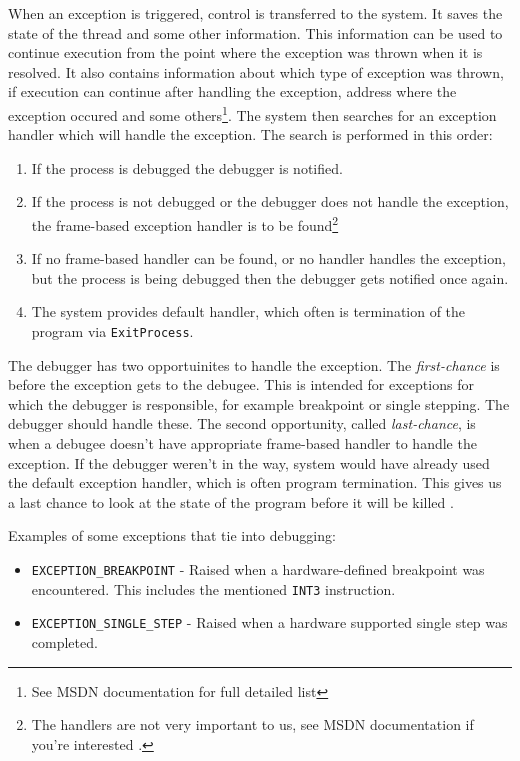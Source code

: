 When an exception is triggered, control is transferred to the system. It saves
the state of the thread and some other information. This information can be
used to continue execution from the point where the exception was thrown when
it is resolved. It also contains information about which type of exception was
thrown, if execution can continue after handling the exception, address where
the exception occured and some others\footnote{See MSDN documentation
\cite{windows-msdn-seh} for full detailed list}. The system then searches for
an exception handler which will handle the exception. The search is performed
in this order:

\begin{enumerate}
    \item If the process is debugged the debugger is notified.
    \item If the process is not debugged or the debugger does not handle the
        exception, the frame-based exception handler is to be
        found\footnote{The handlers are not very important to us, see MSDN
        documentation if you're interested \cite{windows-msdn-seh}.}
    \item If no frame-based handler can be found, or no handler handles the
        exception, but the process is being debugged then the debugger gets
        notified once again.
    \item The system provides default handler, which often is termination of
        the program via \texttt{ExitProcess}.
\end{enumerate}

The debugger has two opportuinites to handle the exception. The
\textit{first-chance} is before the exception gets to the debugee. This is
intended for exceptions for which the debugger is responsible, for example
breakpoint or single stepping. The debugger should handle these. The second
opportunity, called \textit{last-chance}, is when a debugee doesn't have
appropriate frame-based handler to handle the exception. If the debugger
weren't in the way, system would have already used the default exception
handler, which is often program termination. This gives us a last chance to
look at the state of the program before it will be killed
\cite{windows-msdn-dbg-exc-handling}.

Examples of some exceptions that tie into debugging:
\begin{itemize}
    \item \texttt{EXCEPTION_BREAKPOINT} - Raised when a hardware-defined
        breakpoint was encountered. This includes the mentioned
        \texttt{INT3} instruction.
    \item \texttt{EXCEPTION_SINGLE_STEP} - Raised when a hardware supported
        single step was completed.
\end{itemize}

